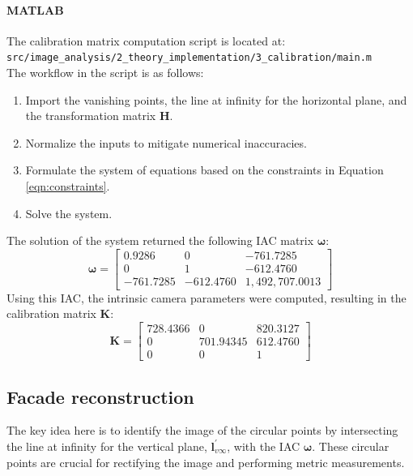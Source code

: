 \documentclass{Academic}
\begin{document}
\paragraph*{MATLAB}
The calibration matrix computation script is located at: \\ 
\texttt{src/image\_analysis/2\_theory\_implementation/3\_calibration/main.m} \\
The workflow in the script is as follows:
\begin{enumerate}
    \item Import the vanishing points, the line at infinity for the horizontal plane, and the transformation matrix $\mathbf{H}$.
    \item Normalize the inputs to mitigate numerical inaccuracies.
    \item Formulate the system of equations based on the constraints in Equation \eqref{eqn:constraints}.
    \item Solve the system.
\end{enumerate}
The solution of the system returned the following IAC matrix $\boldsymbol{\omega}$:
\begin{equation} \boldsymbol{\omega} = \begin{bmatrix} 
    0.9286 & 0 & -761.7285 \\
    0 & 1 & -612.4760 \\
    -761.7285 & -612.4760 & 1,492,707.0013
\end{bmatrix}
\end{equation}
\noindent Using this IAC, the intrinsic camera parameters were computed, resulting in the calibration matrix $\mathbf{K}$:
\begin{equation}\mathbf{K} = \begin{bmatrix} 
    728.4366 & 0 & 820.3127 \\
    0 & 701.94345 & 612.4760 \\ 
    0 & 0 & 1 
\end{bmatrix}\end{equation}

\subsection{Facade reconstruction}
The key idea here is to identify the image of the circular points by intersecting the line at infinity for the vertical plane, $\mathbf{l}_{v\infty}^\prime$, with the IAC $\boldsymbol{\omega}$. 
These circular points are crucial for rectifying the image and performing metric measurements.
\end{document}
